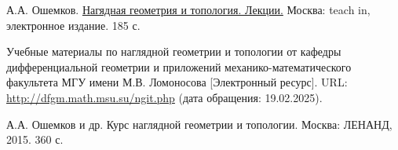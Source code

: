 \begin{thebibliography}{2}
    А.А. Ошемков. \href{https://teach-in.ru/file/synopsis/pdf/visual-geometry-and-topology-oshemkov-M.pdf}{Нагядная геометрия и топология. Лекции.} Москва: teach in, электронное издание. 185 с.
    
    Учебные материалы по наглядной геометрии и топологии от кафедры дифференциальной геометрии и приложений механико-математического факультета МГУ имени М.В. Ломоносова [Электронный ресурс]. URL: \href{http://dfgm.math.msu.su/ngit.php}{http://dfgm.math.msu.su/ngit.php} (дата обращения: 19.02.2025).

    А.А. Ошемков и др. Курс наглядной геометрии и топологии. Москва: ЛЕНАНД, 2015. 360 с.


\end{thebibliography}